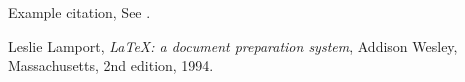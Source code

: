 \documentclass[preprint,12pt,authoryear]{elsarticle}
\begin{document}
Example citation, See \citet{lamport94}.




\begin{thebibliography}{00}


  Leslie Lamport,
  \textit{\LaTeX: a document preparation system},
  Addison Wesley, Massachusetts,
  2nd edition,
  1994.

\end{thebibliography}
\end{document}
